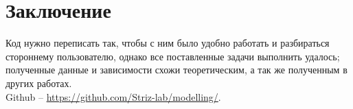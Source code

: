 \section{Заключение}
Код нужно переписать так, чтобы с ним было удобно работать и разбираться стороннему пользователю, однако все поставленные задачи выполнить удалось; полученные данные и зависимости схожи теоретическим, а так же полученным в других работах. \\
Github -- \href{https://github.com/Striz-lab/modelling/tree/main/}{https://github.com/Striz-lab/modelling/}.



